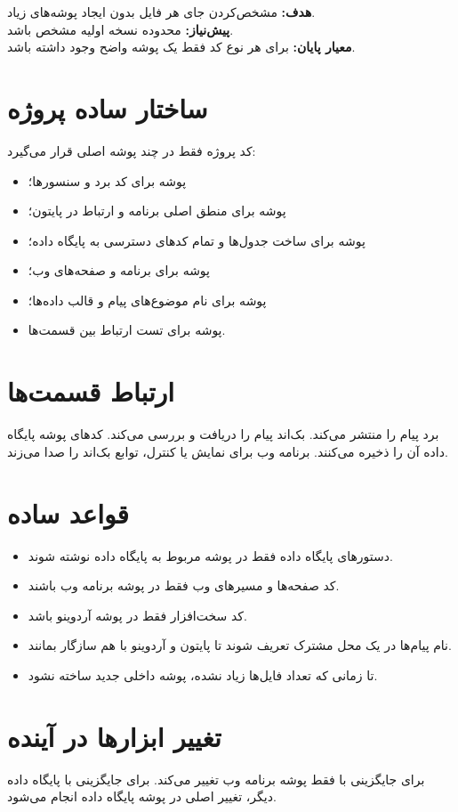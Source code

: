 \begin{phasebox}
\textbf{هدف:} مشخص‌کردن جای هر فایل بدون ایجاد پوشه‌های زیاد.\\
\textbf{پیش‌نیاز:} محدوده نسخه اولیه مشخص باشد.\\
\textbf{معیار پایان:} برای هر نوع کد فقط یک پوشه واضح وجود داشته باشد.
\end{phasebox}

\section{ساختار ساده پروژه}
کد پروژه فقط در چند پوشه اصلی قرار می‌گیرد:

\begin{itemize}
    \item پوشه
    برای کد برد و سنسورها؛
    \item پوشه
    برای منطق اصلی برنامه و ارتباط
    در پایتون؛
    \item پوشه
    برای ساخت جدول‌ها و تمام کدهای دسترسی به پایگاه داده؛
    \item پوشه
    برای برنامه
    و صفحه‌های وب؛
    \item پوشه
    برای نام موضوع‌های پیام و قالب داده‌ها؛
    \item پوشه
    برای تست ارتباط بین قسمت‌ها.
\end{itemize}

\section{ارتباط قسمت‌ها}
برد پیام را منتشر می‌کند. بک‌اند پیام را دریافت و بررسی می‌کند. کدهای پوشه پایگاه داده آن را ذخیره می‌کنند. برنامه وب برای نمایش یا کنترل، توابع بک‌اند را صدا می‌زند.

\section{قواعد ساده}
\begin{itemize}
    \item دستورهای پایگاه داده فقط در پوشه مربوط به پایگاه داده نوشته شوند.
    \item کد صفحه‌ها و مسیرهای وب فقط در پوشه برنامه وب باشند.
    \item کد سخت‌افزار فقط در پوشه آردوینو باشد.
    \item نام پیام‌ها در یک محل مشترک تعریف شوند تا پایتون و آردوینو با هم سازگار بمانند.
    \item تا زمانی که تعداد فایل‌ها زیاد نشده، پوشه داخلی جدید ساخته نشود.
\end{itemize}

\section{تغییر ابزارها در آینده}
برای جایگزینی
با
فقط پوشه برنامه وب تغییر می‌کند. برای جایگزینی
با پایگاه داده دیگر، تغییر اصلی در پوشه پایگاه داده انجام می‌شود.
